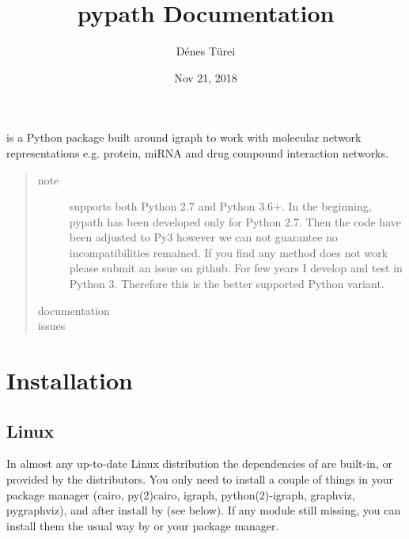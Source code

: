 \documentclass[letterpaper,10pt,english]{sphinxmanual}
\title{pypath Documentation}
\date{Nov 21, 2018}
\author{Dénes Türei}
\begin{document}
\maketitle
\sphinxtableofcontents
{}\label{\detokenize{index::doc}}


 is a Python package built around igraph to work with molecular
network representations e.g. protein, miRNA and drug compound interaction
networks.
\begin{quote}\begin{description}
\item[{note}] \leavevmode
{} supports both Python 2.7 and Python 3.6+. In the beginning,
pypath has been developed only for Python 2.7. Then the code have been
adjusted to Py3 however we can not guarantee no incompatibilities
remained. If you find any method does not work please submit an issue on
github. For few years I develop and test  in Python 3. Therefore
this is the better supported Python variant.

\item[{documentation}] \leavevmode
{}

\item[{issues}] \leavevmode
{}

\end{description}\end{quote}


\chapter{Installation}
\label{\detokenize{installation:installation}}\label{\detokenize{installation::doc}}

\section{Linux}
\label{\detokenize{installation:linux}}
In almost any up-to-date Linux distribution the dependencies of  are
built-in, or provided by the distributors. You only need to install a couple
of things in your package manager (cairo, py(2)cairo, igraph,
python(2)-igraph, graphviz, pygraphviz), and after install  by 
(see below). If any module still missing, you can install them the usual way
by  or your package manager.
\end{document}
